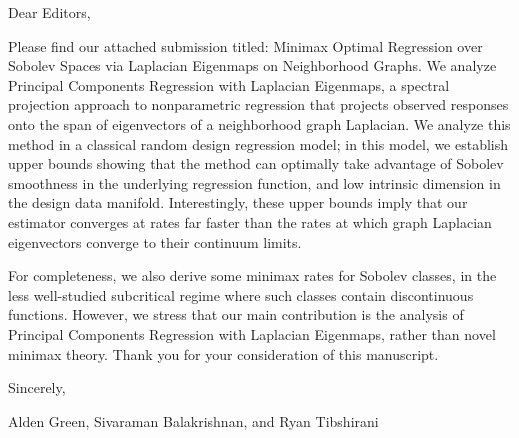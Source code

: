 \documentclass{article}
\begin{document}
Dear Editors, 

\vspace{.2 in}

Please find our attached submission titled: Minimax Optimal Regression over Sobolev Spaces via Laplacian Eigenmaps on Neighborhood Graphs. We analyze Principal Components Regression with Laplacian Eigenmaps, a spectral projection approach to nonparametric regression that projects observed responses onto the span of eigenvectors of a neighborhood graph Laplacian. We analyze this method in a classical random design regression model; in this model, we establish upper bounds showing that the method can optimally take advantage of Sobolev smoothness in the underlying regression function, and low intrinsic dimension in the design data manifold. Interestingly, these upper bounds imply that our estimator converges at rates far faster than the rates at which graph Laplacian eigenvectors converge to their continuum limits. 

For completeness, we also derive some minimax rates for Sobolev classes, in the less well-studied subcritical regime where such classes contain discontinuous functions. However, we stress that our main contribution is the analysis of Principal Components Regression with Laplacian Eigenmaps, rather than novel minimax theory. Thank you for your consideration of this manuscript.
\vspace{.2 in}

Sincerely,

\vspace{.1 in}
Alden Green, Sivaraman Balakrishnan, and Ryan Tibshirani
	
	
	
\end{document}
